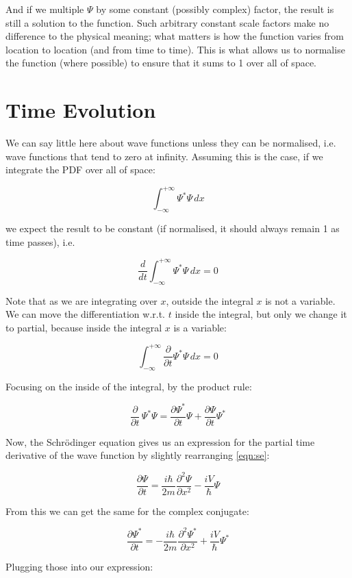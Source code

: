 And if we multiple $\Psi$ by some constant (possibly complex) factor, the result is still a solution to the function. Such arbitrary constant scale factors make no difference to the physical meaning; what matters is how the function varies from location to location (and from time to time). This is what allows us to normalise the function (where possible) to ensure that it sums to 1 over all of space.

\section{Time Evolution}

We can say little here about wave functions unless they can be normalised, i.e. wave functions that tend to zero at infinity. Assuming this is the case, if we integrate the PDF over all of space:

$$
\int_{-\infty}^{+\infty}
\Psi^*\Psi
\,dx
$$

we expect the result to be constant (if normalised, it should always remain 1 as time passes), i.e.

$$
\frac{d}{d t}
\int_{-\infty}^{+\infty}
\Psi^*\Psi
\,dx
= 0
$$

Note that as we are integrating over $x$, outside the integral $x$ is not a variable. We can move the differentiation w.r.t. $t$ inside the integral, but only we change it to partial, because inside the integral $x$ is a variable:

$$
\int_{-\infty}^{+\infty}
\frac{\partial}{\partial t}
\Psi^*\Psi
\,dx
= 0
$$

Focusing on the inside of the integral, by the product rule:

$$
\frac{\partial}{\partial t} \, \Psi^*\Psi
=
\frac{\partial \Psi^*}{\partial t} \Psi
+
\frac{\partial \Psi}{\partial t} \Psi^*
$$

Now, the Schrödinger equation gives us an expression for the partial time derivative of the wave function by slightly rearranging \eqref{eqn:se}:

$$
\frac{\partial \Psi}{\partial t}
=
\frac{i \hbar}{2m} \frac{\partial^2 \Psi}{\partial x^2}
- \frac{i V}{\hbar}{\Psi}
$$

From this we can get the same for the complex conjugate:

$$
\frac{\partial \Psi^*}{\partial t}
=
- \frac{i \hbar}{2m} \frac{\partial^2 \Psi^*}{\partial x^2}
+ \frac{i V}{\hbar}{\Psi^*}
$$

Plugging those into our expression:

